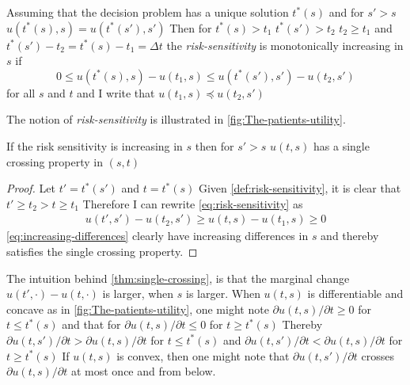 \documentclass[10pt,a4paper]{article} 					%
\begin{document}
\begin{defn}\label{def:risk-sensitivity}
Assuming that the decision problem has a unique solution \(t^{*}(s)\)  and for \(s'>s\)  \(u(t^{*}(s),s)=u(t^{*}(s'),s')\)  Then for  \(t^{*}(s)>t_{1}\)  \(t^{*}(s')>t_{2}\)  \(t_{2}\ge t_{1}\) and \(t^{*}(s')-t_{2}=t^{*}(s)-t_{1}=\Delta t\)  the \emph{risk-sensitivity} is monotonically increasing in \(s\)  if
\[
	0\le u(t^{*}(s),s)-u(t_{1},s)\le u(t^{*}(s'),s')-u(t_{2},s')\label{eq:risk-sensitivity}
\]
for all \(s\) and \(t\)  and I write that \(u(t_{1},s)\preceq u(t_{2},s')\)
\end{defn}

The notion of \emph{risk-sensitivity} is illustrated in \cref{fig:The-patients-utility}.

\begin{thm}\label{thm:single-crossing}
If the risk sensitivity is increasing in \(s\)  then for \(s'>s\)  \(u(t,s)\) has a single crossing property in \((s,t)\)
\end{thm}

\begin{proof}
Let \(t'=t^{*}(s')\) and \(t=t^{*}(s)\)  Given \cref{def:risk-sensitivity}, it is clear that \(t'\ge t_{2}>t\ge t_{1}\)  Therefore I can rewrite \cref{eq:risk-sensitivity} as
\begin{align}
  u(t',s')-u(t_{2},s')\ge u(t,s)-u(t_{1},s)\ge0\label{eq:increasing-differences}
\end{align}
\cref{eq:increasing-differences} clearly have increasing differences in \(s\) and thereby satisfies the single crossing property.
\end{proof}

The intuition behind \cref{thm:single-crossing}, is that the marginal change \(u(t',\cdot)-u(t,\cdot)\) is larger, when \(s\) is larger. When \(u(t,s)\) is differentiable and concave as in \cref{fig:The-patients-utility}, one might note \(\partial u(t,s)/\partial t\ge0\) for \(t\le t^{*}(s)\) and that for \(\partial u(t,s)/\partial t\le0\) for \(t\ge t^{*}(s)\)  Thereby \(\partial u(t,s')/\partial t>\partial u(t,s)/\partial t\) for \(t\le t^{*}(s)\) and \(\partial u(t,s')/\partial t<\partial u(t,s)/\partial t\) for \(t\ge t^{*}(s)\)  If \(u(t,s)\) is convex, then one might note that \(\partial u(t,s')/\partial t\) crosses \(\partial u(t,s)/\partial t\) at most once and from below.
\end{document}

